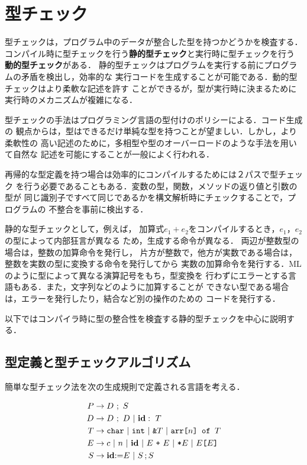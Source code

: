 \documentclass[a4j,dvipdfmx]{jbook}
\begin{document}
\section{型チェック}

型チェックは，プログラム中のデータが整合した型を持つかどうかを検査する．
コンパイル時に型チェックを行う{\bf 静的型チェック}と実行時に型チェックを行う
{\bf 動的型チェック}がある．
静的型チェックはプログラムを実行する前にプログラムの矛盾を検出し，効率的な
実行コードを生成することが可能である．動的型チェックはより柔軟な記述を許す
ことができるが，型が実行時に決まるために実行時のメカニズムが複雑になる．

型チェックの手法はプログラミング言語の型付けのポリシーによる．コード生成の
観点からは，型はできるだけ単純な型を持つことが望ましい．しかし，より柔軟性の
高い記述のために，多相型や型のオーバーロードのような手法を用いて自然な
記述を可能にすることが一般によく行われる．

再帰的な型定義を持つ場合は効率的にコンパイルするためには２パスで型チェック
を行う必要であることもある．変数の型，関数，メソッドの返り値と引数の型が
同じ識別子ですべて同じであるかを構文解析時にチェックすることで，プログラムの
不整合を事前に検出する．

静的な型チェックとして，例えば，
加算式$e_1+e_2$をコンパイルするとき，$e_1$，$e_2$の型によって内部狂言が異なる
ため，生成する命令が異なる．
両辺が整数型の場合は，整数の加算命令を発行し，
片方が整数で，他方が実数である場合は，整数を実数の型に変換する命令を発行してから
実数の加算命令を発行する．MLのように型によって異なる演算記号をもち，型変換を
行わずにエラーとする言語もある．また，文字列などのように加算することが
できない型である場合は，エラーを発行したり，結合など別の操作のための
コードを発行する．

以下ではコンパイラ時に型の整合性を検査する静的型チェックを中心に説明する．

\subsection{型定義と型チェックアルゴリズム}

簡単な型チェック法を次の生成規則で定義される言語を考える．

\begin{center}
    \begin{minipage}{.4\linewidth}
        \begin{align*}
            P & \rightarrow D\ ;\ S                                                                                 \\
            D & \rightarrow D\ ;\ D\ |\ \mathbf{id}:\ T                                                             \\
            T & \rightarrow \texttt{char}\ |\ \texttt{int}\ |\ \texttt{\&}T\ |\ \texttt{arr[}n\texttt{]\ of\ } T    \\
            E & \rightarrow c\ |\ n\ |\ \mathbf{id}\ |\ E\ \texttt{+}\ E\ |\ \texttt{*}E\ |\ E\texttt{[}E\texttt{]} \\
            S & \rightarrow \mathbf{id}\ttassgn E\ |\ S\,\ttsc\,S
        \end{align*}
    \end{minipage}
\end{center}
\end{document}
